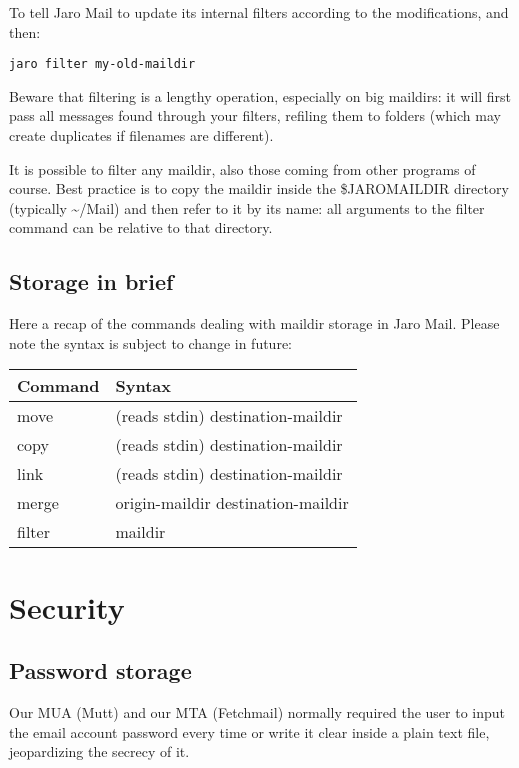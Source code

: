 \documentclass[a4,onecolumn,portrait]{article}
\begin{document}
To tell Jaro Mail to update its internal filters according to the modifications, and then:

\begin{verbatim}
jaro filter my-old-maildir
\end{verbatim}

Beware that filtering is a lengthy operation, especially on big
maildirs: it will first pass all messages found through your filters,
refiling them to folders (which may create duplicates if filenames are different).

It is possible to filter any maildir, also those coming from other
programs of course. Best practice is to copy the maildir inside the
\$JAROMAILDIR directory (typically \textasciitilde{}/Mail) and then refer to it by its
name: all arguments to the filter command can be relative to that
directory.
\subsection{Storage in brief}
\label{sec-10-4}

Here a recap of the commands dealing with maildir storage in Jaro Mail. Please note the syntax is subject to change in future:

\begin{center}
\begin{tabular}{ll}
Command & Syntax\\
\hline
move & (reads stdin) destination-maildir\\
copy & (reads stdin) destination-maildir\\
link & (reads stdin) destination-maildir\\
merge & origin-maildir destination-maildir\\
filter & maildir\\
\end{tabular}
\end{center}
\section{Security}
\label{sec-11}

\subsection{Password storage}
\label{sec-11-1}

Our MUA (Mutt) and our MTA (Fetchmail) normally required the user to input the email account password every time or write it clear inside a plain text file, jeopardizing the secrecy of it.
\end{document}
